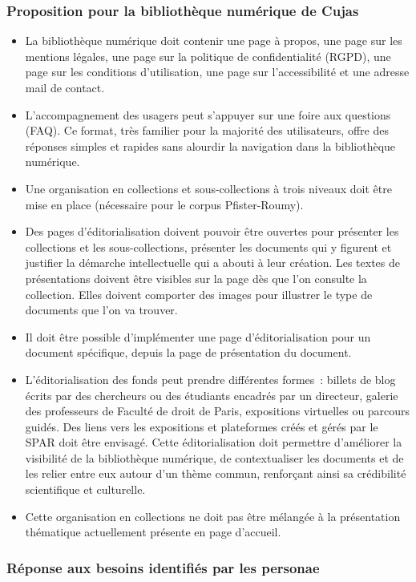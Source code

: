 \subsubsection{Proposition pour la bibliothèque numérique de Cujas}
\begin{itemize}
	\item La bibliothèque numérique doit contenir une page à propos, une page sur les mentions légales, une page sur la politique de confidentialité (RGPD), une page sur les conditions d’utilisation, une page sur l’accessibilité et une adresse mail de contact.
\item L’accompagnement des usagers peut s’appuyer sur une foire aux questions (FAQ). Ce format, très familier pour la majorité des utilisateurs, offre des réponses simples et rapides sans alourdir la navigation dans la bibliothèque numérique. 
\item Une organisation en collections et sous-collections à trois niveaux doit être mise en place (nécessaire pour le corpus Pfister-Roumy). 
\item Des pages d’éditorialisation doivent pouvoir être ouvertes pour présenter les collections et les sous-collections, présenter les documents qui y figurent et justifier la démarche intellectuelle qui a abouti à leur création. Les textes de présentations doivent être visibles sur la page dès que l’on consulte la collection. Elles doivent comporter des images pour illustrer le type de documents que l’on va trouver.
\item Il doit être possible d’implémenter une page d’éditorialisation pour un document spécifique, depuis la page de présentation du document. 
\item L’éditorialisation des fonds peut prendre différentes formes : billets de blog écrits par des chercheurs ou des étudiants encadrés par un directeur, galerie des professeurs de Faculté de droit de Paris, expositions virtuelles ou parcours guidés. Des liens vers les expositions et plateformes créés et gérés par le SPAR doit être envisagé. Cette éditorialisation doit permettre d’améliorer la visibilité de la bibliothèque numérique, de contextualiser les documents et de les relier entre eux autour d’un thème commun, renforçant ainsi sa crédibilité scientifique et culturelle.
\item Cette organisation en collections ne doit pas être mélangée à la présentation thématique actuellement présente en page d’accueil. 
\end{itemize}

\subsubsection{Réponse aux besoins identifiés par les personae}

